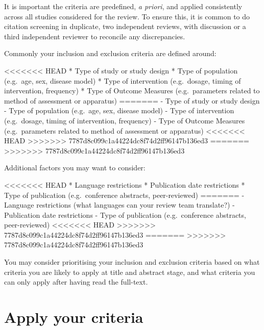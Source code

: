 \documentclass[
]{book}
\begin{document}
It is important the criteria are predefined, \emph{a priori}, and applied consistently across all studies considered for the review. To ensure this, it is common to do citation screening in duplicate, two independent reviews, with discussion or a third independent reviewer to reconcile any discrepancies.

Commonly your inclusion and exclusion criteria are defined around:

\textless\textless\textless\textless\textless\textless\textless{} HEAD
* Type of study or study design
* Type of population (e.g.~age, sex, disease model)
* Type of intervention (e.g.~dosage, timing of intervention, frequency)
* Type of Outcome Measures (e.g.~parameters related to method of assessment or apparatus)
=======
- Type of study or study design
- Type of population (e.g.~age, sex, disease model)
- Type of intervention (e.g.~dosage, timing of intervention, frequency)
- Type of Outcome Measures (e.g.~parameters related to method of assessment or apparatus)
\textless\textless\textless\textless\textless\textless\textless{} HEAD
\textgreater\textgreater\textgreater\textgreater\textgreater\textgreater\textgreater{} 7787d8c099c1a44224dc8f74d2ff96147b136ed3
=======
\textgreater\textgreater\textgreater\textgreater\textgreater\textgreater\textgreater{} 7787d8c099c1a44224dc8f74d2ff96147b136ed3

Additional factors you may want to consider:

\textless\textless\textless\textless\textless\textless\textless{} HEAD
* Language restrictions
* Publication date restrictions
* Type of publication (e.g.~conference abstracts, peer-reviewed)
=======
- Language restrictions (what languages can your review team translate?)
- Publication date restrictions
- Type of publication (e.g.~conference abstracts, peer-reviewed)
\textless\textless\textless\textless\textless\textless\textless{} HEAD
\textgreater\textgreater\textgreater\textgreater\textgreater\textgreater\textgreater{} 7787d8c099c1a44224dc8f74d2ff96147b136ed3
=======
\textgreater\textgreater\textgreater\textgreater\textgreater\textgreater\textgreater{} 7787d8c099c1a44224dc8f74d2ff96147b136ed3

You may consider prioritising your inclusion and exclusion criteria based on what criteria you are likely to apply at title and abstract stage, and what criteria you can only apply after having read the full-text.

\hypertarget{apply-your-criteria}{%
\section{Apply your criteria}\label{apply-your-criteria}}
\end{document}
